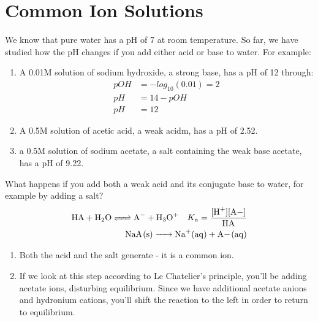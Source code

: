 \documentclass{article}  %
\begin{document}
\section*{Common Ion Solutions}
We know that pure water has a pH of 7 at room temperature. 
So far, we have studied how the pH changes if you add either acid or base to water. For example:
\begin{enumerate}
    \item A 0.01M solution of sodium hydroxide, a strong base, has a pH of 12 through:
    \begin{equation*}
        \begin{aligned}
            pOH &= -log_{10}(0.01) = 2 \\
            pH &= 14-pOH \\
            pH &= 12
        \end{aligned}
    \end{equation*}
    \item A 0.5M solution of acetic acid, a weak acidm, has a pH of 2.52.
    \item a 0.5M solution of sodium acetate, a salt containing the weak base acetate, has a pH of 9.22.
\end{enumerate}
What happens if you add both a weak acid and its conjugate base to water, for example by adding a salt?
\begin{equation*}
    \begin{aligned}
        \ce{HA + H2O <=> A- + H3O+} \quad K_a = \ce{\frac{[H+][A-]}{HA}} \\
        \ce{NaA_(s) -> Na+_(aq) + A-_(aq)} 
    \end{aligned}
\end{equation*}
\begin{enumerate}
    \item Both the acid and the salt generate  - it is a common ion.
    \item If we look at this step according to Le Chatelier's principle, you'll be adding acetate ions, disturbing equilibrium. Since we have additional acetate anions and hydronium cations, you'll shift the reaction to the left in order to return to equilibrium.
\end{enumerate}
\end{document}
